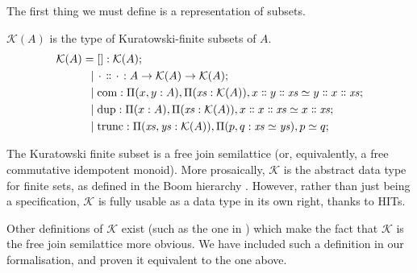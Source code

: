 The first thing we must define is a representation of subsets.
\begin{romdefinition}
  \(\mathcal{K}(A)\) is the type of Kuratowski-finite subsets of \(A\).
  \begin{equation}
    \begin{aligned}
      \mathcal{K}(A) =&
      \; [] : \mathcal{K}(A) ; \\
      \vert& \; \wc \dblcolon \wc : A \rightarrow \mathcal{K}(A) \rightarrow \mathcal{K}(A) ; \\
      \vert& \; \text{com} : \Pi (x, y: A) , \Pi (\mathit{xs} : \mathcal{K}(A)) , x \dblcolon y \dblcolon \mathit{xs} \simeq y \dblcolon x \dblcolon \mathit{xs} ; \\
      \vert& \; \text{dup} : \Pi (x : A) , \Pi (\mathit{xs} : \mathcal{K}(A)) , x \dblcolon x \dblcolon \mathit{xs} \simeq x \dblcolon \mathit{xs} ; \\
      \vert& \; \text{trunc} : \Pi (\mathit{xs}, \mathit{ys}: \mathcal{K}(A)) , \Pi (p, q : \mathit{xs} \simeq \mathit{ys}) , p \simeq q ;
    \end{aligned}
  \end{equation}
\end{romdefinition}
The Kuratowski finite subset is a free join semilattice (or, equivalently, a
free commutative idempotent monoid).
More prosaically, \(\mathcal{K}\) is the abstract data type for finite sets, as
defined in the Boom hierarchy \cite{boomFurtherThoughtsAbstracto1981,
  bunkenburgBoomHierarchy1994}.
However, rather than just being a specification, \(\mathcal{K}\) is fully usable
as a data type in its own right, thanks to HITs.

Other definitions of \(\mathcal{K}\) exist (such as the one in
\cite{fruminFiniteSetsHomotopy2018}) which make the fact that \(\mathcal{K}\) is
the free join semilattice more obvious.
We have included such a definition in our formalisation, and proven it
equivalent to the one above.

